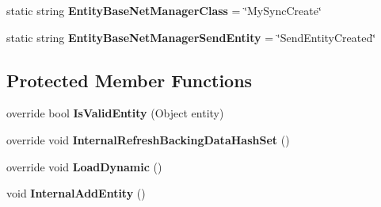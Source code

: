 \begin{DoxyCompactItemize}
\item 
\hypertarget{class_s_e_mod_a_p_i_internal_1_1_a_p_i_1_1_entity_1_1_sector_object_manager_ac9e1c670158ed4a095cafa0d840bf7a6}{}static string {\bfseries Entity\+Base\+Net\+Manager\+Class} = \char`\"{}My\+Sync\+Create\char`\"{}\label{class_s_e_mod_a_p_i_internal_1_1_a_p_i_1_1_entity_1_1_sector_object_manager_ac9e1c670158ed4a095cafa0d840bf7a6}

\item 
\hypertarget{class_s_e_mod_a_p_i_internal_1_1_a_p_i_1_1_entity_1_1_sector_object_manager_aaf1c233cb4296b708192142f3e98d6bb}{}static string {\bfseries Entity\+Base\+Net\+Manager\+Send\+Entity} = \char`\"{}Send\+Entity\+Created\char`\"{}\label{class_s_e_mod_a_p_i_internal_1_1_a_p_i_1_1_entity_1_1_sector_object_manager_aaf1c233cb4296b708192142f3e98d6bb}

\end{DoxyCompactItemize}
\subsection*{Protected Member Functions}
\begin{DoxyCompactItemize}
\item 
\hypertarget{class_s_e_mod_a_p_i_internal_1_1_a_p_i_1_1_entity_1_1_sector_object_manager_aae086157afa4e4c0ec06b82484b3ed18}{}override bool {\bfseries Is\+Valid\+Entity} (Object entity)\label{class_s_e_mod_a_p_i_internal_1_1_a_p_i_1_1_entity_1_1_sector_object_manager_aae086157afa4e4c0ec06b82484b3ed18}

\item 
\hypertarget{class_s_e_mod_a_p_i_internal_1_1_a_p_i_1_1_entity_1_1_sector_object_manager_a530a19e560366b3927f3c993842a776b}{}override void {\bfseries Internal\+Refresh\+Backing\+Data\+Hash\+Set} ()\label{class_s_e_mod_a_p_i_internal_1_1_a_p_i_1_1_entity_1_1_sector_object_manager_a530a19e560366b3927f3c993842a776b}

\item 
\hypertarget{class_s_e_mod_a_p_i_internal_1_1_a_p_i_1_1_entity_1_1_sector_object_manager_a184791ff36cb2f1cc9555a541a353153}{}override void {\bfseries Load\+Dynamic} ()\label{class_s_e_mod_a_p_i_internal_1_1_a_p_i_1_1_entity_1_1_sector_object_manager_a184791ff36cb2f1cc9555a541a353153}

\item 
\hypertarget{class_s_e_mod_a_p_i_internal_1_1_a_p_i_1_1_entity_1_1_sector_object_manager_a4b8c0b8ebe04cc09be5c6774ebb3fc12}{}void {\bfseries Internal\+Add\+Entity} ()\label{class_s_e_mod_a_p_i_internal_1_1_a_p_i_1_1_entity_1_1_sector_object_manager_a4b8c0b8ebe04cc09be5c6774ebb3fc12}

\end{DoxyCompactItemize}
